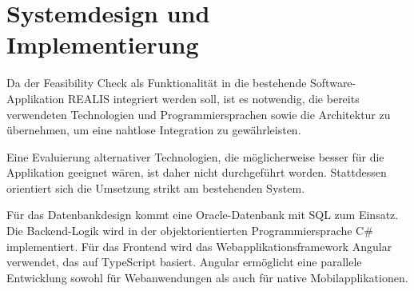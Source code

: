 \chapter{Systemdesign und Implementierung}

Da der Feasibility Check als Funktionalität in die bestehende Software-Applikation \gls{REALIS} integriert werden soll, ist es notwendig, die bereits verwendeten Technologien und Programmiersprachen sowie die Architektur zu übernehmen, um eine nahtlose Integration zu gewährleisten.

Eine Evaluierung alternativer Technologien, die möglicherweise besser für die Applikation geeignet wären, ist daher nicht durchgeführt worden. Stattdessen orientiert sich die Umsetzung strikt am bestehenden System.

Für das Datenbankdesign kommt eine Oracle-Datenbank mit SQL zum Einsatz. Die Backend-Logik wird in der objektorientierten Programmiersprache C\# implementiert. Für das Frontend wird das Webapplikationsframework Angular verwendet, das auf TypeScript basiert. Angular ermöglicht eine parallele Entwicklung sowohl für Webanwendungen als auch für native Mobilapplikationen.













